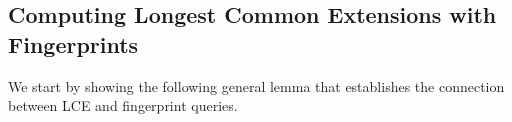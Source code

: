 \subsection{Computing Longest Common Extensions with Fingerprints}

We start by showing the following general lemma that establishes the connection between LCE and fingerprint queries.

